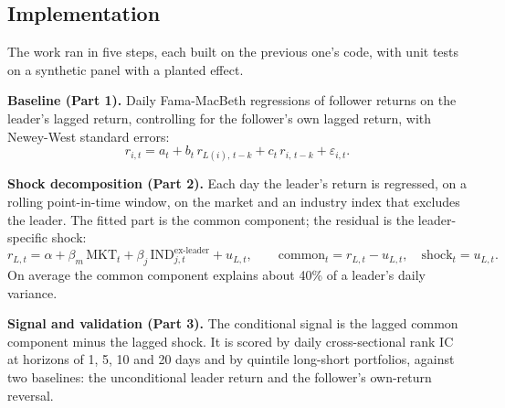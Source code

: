 \documentclass[11pt,letterpaper]{article}
\begin{document}
\subsection{Implementation}

The work ran in five steps, each built on the previous one's code, with unit
tests on a synthetic panel with a planted effect.

\textbf{Baseline (Part 1).} Daily Fama-MacBeth regressions of follower returns
on the leader's lagged return, controlling for the follower's own lagged
return, with Newey-West standard errors:
\[
r_{i,t} = a_t + b_t\, r_{L(i),\,t-k} + c_t\, r_{i,\,t-k} + \varepsilon_{i,t}.
\]

\textbf{Shock decomposition (Part 2).} Each day the leader's return is
regressed, on a rolling point-in-time window, on the market and an industry
index that excludes the leader. The fitted part is the common component; the
residual is the leader-specific shock:
\[
r_{L,t} = \alpha + \beta_m\, \mathrm{MKT}_t + \beta_j\,
\mathrm{IND}^{\text{ex-leader}}_{j,t} + u_{L,t}, \qquad
\mathrm{common}_t = r_{L,t} - u_{L,t}, \quad \mathrm{shock}_t = u_{L,t}.
\]
On average the common component explains about 40\% of a leader's daily
variance.

\textbf{Signal and validation (Part 3).} The conditional signal is the lagged
common component minus the lagged shock. It is scored by daily cross-sectional
rank IC at horizons of 1, 5, 10 and 20 days and by quintile long-short
portfolios, against two baselines: the unconditional leader return and the
follower's own-return reversal.
\end{document}
